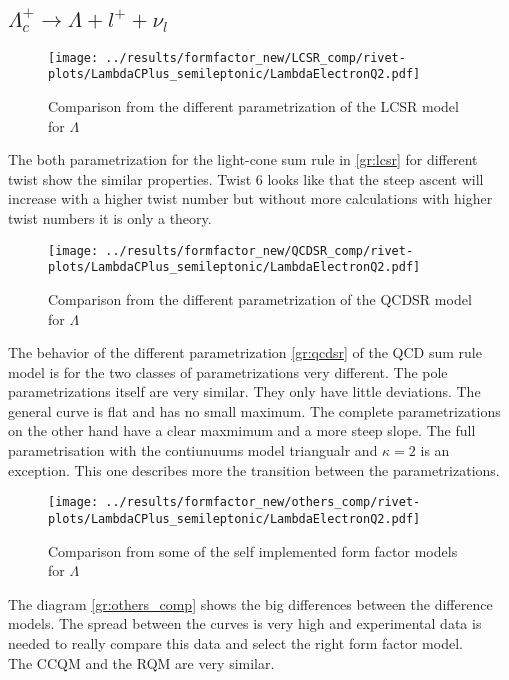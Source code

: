 \subsection{\(\Lambda_c^+ \rightarrow \Lambda + l^+ + \nu_l\)}
\begin{figure}[h]
  \centering
  \texttt{[image: ../results/formfactor\_new/LCSR\_comp/rivet-plots/LambdaCPlus\_semileptonic/LambdaElectronQ2.pdf]}
  \caption{Comparison from the different parametrization of the LCSR model for \(\Lambda\)} \label{gr:lcsr}
\end{figure}
The both parametrization for the light-cone sum rule in {\eqref{gr:lcsr}} for 
different twist show the similar properties. Twist 6 looks like that the steep 
ascent will increase with a higher twist number but without more calculations 
with higher twist numbers it is only a theory.

\begin{figure}[h]
  \centering
  \texttt{[image: ../results/formfactor\_new/QCDSR\_comp/rivet-plots/LambdaCPlus\_semileptonic/LambdaElectronQ2.pdf]}
  \caption{Comparison from the different parametrization of the QCDSR model for \(\Lambda\)} \label{gr:qcdsr}
\end{figure}
The behavior of the different parametrization {\eqref{gr:qcdsr}} of the QCD sum 
rule model is for the two classes of parametrizations very different. The pole 
parametrizations itself are very similar. They only have little deviations. The 
general curve is flat and has no small maximum. The complete parametrizations 
on the other hand have a clear maxmimum and a more steep slope. The full 
parametrisation with the contiunuums model triangualr and \(\kappa = 2\) is an 
exception. This one describes more the transition between the parametrizations.

\begin{figure}[h]
  \centering
  \texttt{[image: ../results/formfactor\_new/others\_comp/rivet-plots/LambdaCPlus\_semileptonic/LambdaElectronQ2.pdf]}
  \caption{Comparison from some of the self implemented form factor models for \(\Lambda\)} \label{gr:others_comp}
\end{figure}
The diagram {\eqref{gr:others_comp}} shows the big differences between the 
difference models. The spread between the curves is very high and 
experimental data is needed to really compare this data and select the 
right form factor model.\\
The CCQM and the RQM are very similar.

